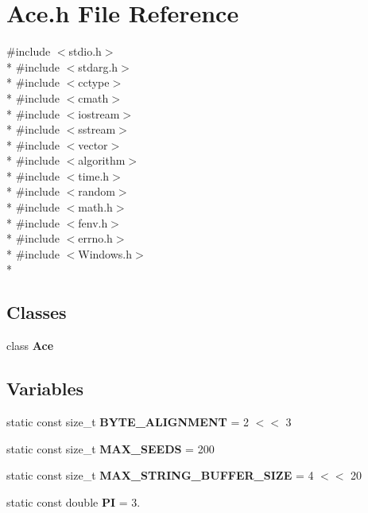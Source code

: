 \section{Ace.\+h File Reference}
\label{_ace_8h}
{\ttfamily \#include $<$stdio.\+h$>$}\\*
{\ttfamily \#include $<$stdarg.\+h$>$}\\*
{\ttfamily \#include $<$cctype$>$}\\*
{\ttfamily \#include $<$cmath$>$}\\*
{\ttfamily \#include $<$iostream$>$}\\*
{\ttfamily \#include $<$sstream$>$}\\*
{\ttfamily \#include $<$vector$>$}\\*
{\ttfamily \#include $<$algorithm$>$}\\*
{\ttfamily \#include $<$time.\+h$>$}\\*
{\ttfamily \#include $<$random$>$}\\*
{\ttfamily \#include $<$math.\+h$>$}\\*
{\ttfamily \#include $<$fenv.\+h$>$}\\*
{\ttfamily \#include $<$errno.\+h$>$}\\*
{\ttfamily \#include $<$Windows.\+h$>$}\\*
\subsection*{Classes}
\begin{DoxyCompactItemize}
\item 
class {\bf Ace}
\end{DoxyCompactItemize}
\subsection*{Variables}
\begin{DoxyCompactItemize}
\item 
static const size\+\_\+t {\bf B\+Y\+T\+E\+\_\+\+A\+L\+I\+G\+N\+M\+E\+NT} = 2 $<$$<$ 3
\item 
static const size\+\_\+t {\bf M\+A\+X\+\_\+\+S\+E\+E\+DS} = 200
\item 
static const size\+\_\+t {\bf M\+A\+X\+\_\+\+S\+T\+R\+I\+N\+G\+\_\+\+B\+U\+F\+F\+E\+R\+\_\+\+S\+I\+ZE} = 4 $<$$<$ 20
\item 
static const double {\bf PI} = 3.
\end{DoxyCompactItemize}


